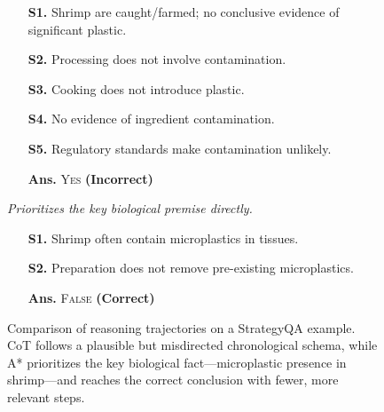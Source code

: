 \documentclass[11pt]{article}
\begin{document}
\begin{figure}[t]
\begin{tcolorbox}
\begin{minipage}[t]{0.485\textwidth}
\begin{tcolorbox}
\vspace{2pt}
\begin{itemize}
    \setlength{\itemsep}{1pt}
    \setlength{\parskip}{0pt}
    \item[\textbf{S1.}] Shrimp are caught/farmed; no conclusive evidence of significant plastic.
    \item[\textbf{S2.}] Processing does not involve contamination.
    \item[\textbf{S3.}] Cooking does not introduce plastic.
    \item[\textbf{S4.}] No evidence of ingredient contamination.
    \item[\textbf{S5.}] Regulatory standards make contamination unlikely.
    \item[\textbf{Ans.}] \textsc{Yes} \hfill \textbf{(Incorrect)}
\end{itemize}
\end{tcolorbox}
\end{minipage}
\hfill
\begin{minipage}[t]{0.485\textwidth}
\begin{tcolorbox}[
    enhanced,
    colback=blue!2,
    colframe=blue!65!black,
    boxrule=0.5pt,
    arc=1.2mm,
    left=5pt, right=5pt, top=4pt, bottom=4pt,
    title=\textbf{\color{blue!75!black}\ding{51} A* Search}\hfill \emph{Heuristic-guided},
    colbacktitle=blue!6,
    coltitle=black,
    fonttitle=\footnotesize
]
\textit{Prioritizes the key biological premise directly.}

\vspace{2pt}
\begin{itemize}
    \setlength{\itemsep}{1pt}
    \setlength{\parskip}{0pt}
    \item[\textbf{S1.}] Shrimp often contain microplastics in tissues.
    \item[\textbf{S2.}] Preparation does not remove pre-existing microplastics.
    \item[\textbf{Ans.}] \textsc{False} \hfill \textbf{(Correct)}
\end{itemize}
\end{tcolorbox}
\end{minipage}

\end{tcolorbox}

\vspace{-2mm}
\caption{Comparison of reasoning trajectories on a StrategyQA example. CoT follows a plausible but misdirected chronological schema, while A* prioritizes the key biological fact—microplastic presence in shrimp—and reaches the correct conclusion with fewer, more relevant steps.}
\label{fig:motivating_example}
\end{figure}
\end{document}
